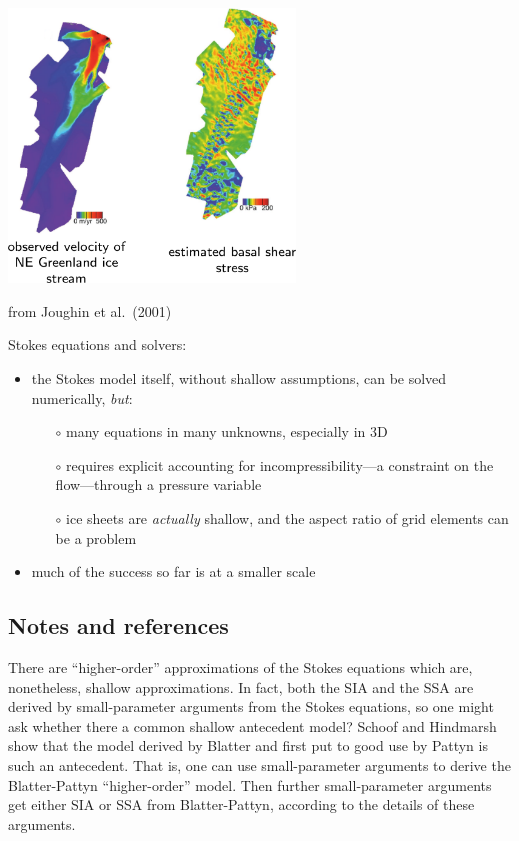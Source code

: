 \documentclass[titlepage,letterpaper,final,12pt]{scrartcl}
\newcommand{\alert}[1]{\emph{#1}}
\begin{document}
\begin{center}
  \includegraphics[width=3.0in]{NEgreenlandJoughin}
  
from Joughin et al.~(2001)\nocite{Joughinetal2001}
\end{center}

Stokes equations and solvers:

\begin{itemize}
\item the Stokes model itself, without shallow assumptions, can be solved numerically, \alert{but}:
  \begin{itemize}
  \item[$\circ$] many equations in many unknowns, especially in 3D
  \item[$\circ$] requires explicit accounting for incompressibility---a constraint on the flow---through a pressure variable
  \item[$\circ$] ice sheets are \emph{actually} shallow, and the aspect ratio of grid elements can be a problem
  \end{itemize}
\item much of the success so far is at a smaller scale
\end{itemize}


\subsection{Notes and references}

There are ``higher-order'' approximations of the Stokes equations which are, nonetheless, shallow approximations.  In fact, both the SIA and the SSA are derived by small-parameter arguments from the Stokes equations, so one might ask whether there a common shallow antecedent model?  Schoof and Hindmarsh \cite{SchoofHindmarsh} show that the model derived by Blatter \cite{Blatter} and first put to good use by Pattyn \cite{Pattyn03} is such an antecedent.  That is, one can use small-parameter arguments to derive the Blatter-Pattyn ``higher-order'' model.  Then further small-parameter arguments get either SIA or SSA from Blatter-Pattyn, according to the details of these arguments.
\end{document}
